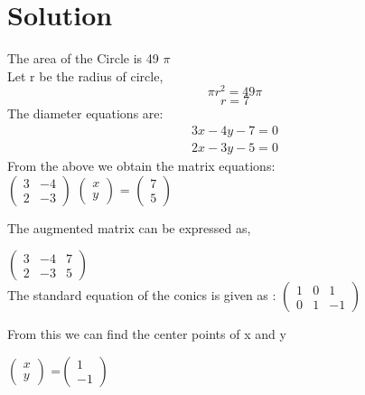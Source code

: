 \documentclass[10pt, a4paper]{article}
\newcommand{\myvec}[1]{\ensuremath{\begin{pmatrix}#1\end{pmatrix}}}
\begin{document}
  \section{Solution}
The area of the Circle is 49 $\pi$\\
Let r be the radius of circle,\\
\begin{equation}
\pi r^2 = 49\pi 
\end{equation}
\begin{equation}
r=7
\end{equation}
The diameter equations are:\\
\begin{align}
3x-4y-7=0
\end{align}
\begin{align}
	2x-3y-5=0
	\end{align}
	From the above we obtain the matrix equations: \\
	\center
\myvec{ 3 & -4 \\ 2 & -3} \myvec{x \\ y} = \myvec{7\\5} \\
\center
\begin{flushleft}
The augmented matrix can be expressed as,
\end{flushleft}
\myvec{ 3 & -4 & 7 \\ 2 & -3 & 5} \\
The standard equation of the conics is given as :
\myvec{ 1 & 0 & 1 \\ 0 & 1 & -1} \vspace{0.3cm}
\begin{flushleft}
From this we can find the center points of x and y
\end{flushleft}
\myvec{ x \\ y} =\myvec{1 \\-1}\\
\end{document}
